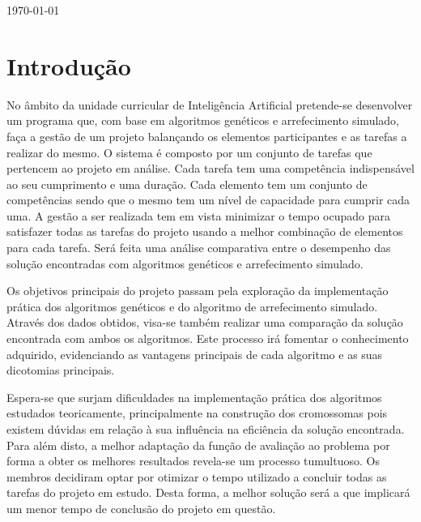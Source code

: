 \begin{titlepage}

{\large \today}\\[0cm] %


\tableofcontents


\section{Introdução} 

\justify\normalsize
No âmbito da unidade curricular de Inteligência Artificial pretende-se desenvolver um programa que, com base em algoritmos genéticos e arrefecimento simulado, faça a gestão de um projeto balançando os elementos participantes e as tarefas a realizar do mesmo. O sistema é composto por um conjunto de tarefas que pertencem ao projeto em análise. Cada tarefa tem uma competência indispensável ao seu cumprimento e uma duração. Cada elemento tem um conjunto de competências sendo que o mesmo tem um nível de capacidade para cumprir cada uma. A gestão a ser realizada tem em vista minimizar o tempo ocupado para satisfazer todas as tarefas do projeto usando a melhor combinação de elementos para cada tarefa. Será feita uma análise comparativa entre o desempenho das solução encontradas com algoritmos genéticos e arrefecimento simulado. 

Os objetivos principais do projeto passam pela exploração da implementação prática dos algoritmos genéticos e do algoritmo de arrefecimento simulado. Através dos dados obtidos, visa-se também realizar uma comparação da solução encontrada com ambos os algoritmos. Este processo irá fomentar o conhecimento adquirido, evidenciando as vantagens principais de cada algoritmo e as suas dicotomias principais.  

Espera-se que surjam dificuldades na implementação prática dos algoritmos estudados teoricamente, principalmente na construção dos cromossomas pois existem dúvidas em relação à sua influência na eficiência da solução encontrada. Para além disto, a melhor adaptação da função de avaliação ao problema por forma a obter os melhores resultados revela-se um processo tumultuoso. Os membros decidiram optar por otimizar o tempo utilizado a concluir todas as tarefas do projeto em estudo. Desta forma, a melhor solução será a que implicará um menor tempo de conclusão do projeto em questão.


\end{titlepage}
